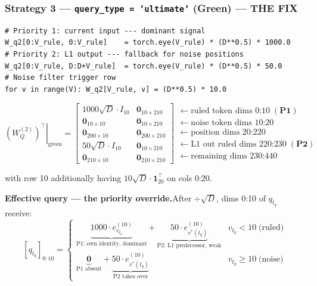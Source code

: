 \documentclass[11pt]{article}
\begin{document}
\subsubsection{Strategy 3 --- \texttt{query\_type = 'ultimate'} (Green) --- THE FIX}

\begin{lstlisting}
# Priority 1: current input --- dominant signal
W_q2[0:V_rule, 0:V_rule]    = torch.eye(V_rule) * (D**0.5) * 1000.0
# Priority 2: L1 output --- fallback for noise positions
W_q2[0:V_rule, D:D+V_rule]  = torch.eye(V_rule) * (D**0.5) * 50.0
# Noise filter trigger row
for v in range(V): W_q2[V_rule, v] = (D**0.5) * 10.0
\end{lstlisting}

\begin{equation}
\left.(W_Q^{(2)})^\top\right|_{\text{green}}=
\begin{bmatrix}
1000\sqrt{D}\cdot I_{10} & \mathbf{0}_{10\times210}\\
\mathbf{0}_{10\times10}  & \mathbf{0}_{10\times210}\\
\mathbf{0}_{200\times10} & \mathbf{0}_{200\times210}\\
50\sqrt{D}\cdot I_{10}   & \mathbf{0}_{10\times210}\\
\mathbf{0}_{210\times10} & \mathbf{0}_{210\times210}
\end{bmatrix}
\begin{array}{l}
\leftarrow\text{ruled token dims }0\text{:}10\;(\mathbf{P1})\\
\leftarrow\text{noise token dims }10\text{:}20\\
\leftarrow\text{position dims }20\text{:}220\\
\leftarrow\text{L1 out ruled dims }220\text{:}230\;(\mathbf{P2})\\
\leftarrow\text{remaining dims }230\text{:}440
\end{array}
\tag{23}
\end{equation}

with row 10 additionally having $10\sqrt{D}\cdot\mathbf{1}_{20}^\top$ on cols 0:20.

\medskip
\textbf{Effective query --- the priority override.}\quad After $\div\sqrt{D}$, dims 0:10 of $q_{t_q}$
receive:
\[
[q_{t_q}]_{0:10}=\begin{cases}
\underbrace{1000\cdot e_{v_{t_q}}^{(10)}}_{\text{P1: own identity, dominant}}
+\underbrace{50\cdot e_{v^*(t_q)}^{(10)}}_{\text{P2: L1 predecessor, weak}}
& v_{t_q}<10\;\text{(ruled)}\\[8pt]
\underbrace{\mathbf{0}}_{\text{P1 absent}}
+\underbrace{50\cdot e_{v^*(t_q)}^{(10)}}_{\text{P2 takes over}}
& v_{t_q}\geq10\;\text{(noise)}
\end{cases}
\tag{24}
\]
\end{document}
